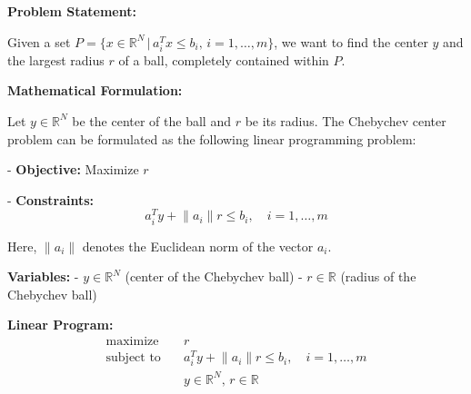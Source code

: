 \documentclass{article}
\begin{document}
\textbf{Problem Statement:}

Given a set \( P = \{ x \in \mathbb{R}^N \,|\, a_i^T x \leq b_i, \, i = 1, \ldots, m \} \), we want to find the center \( y \) and the largest radius \( r \) of a ball, completely contained within \( P \).

\textbf{Mathematical Formulation:}

Let \( y \in \mathbb{R}^N \) be the center of the ball and \( r \) be its radius. The Chebychev center problem can be formulated as the following linear programming problem:

- \textbf{Objective:} Maximize \( r \)

- \textbf{Constraints:}
  \[
  a_i^T y + \lVert a_i \rVert r \leq b_i, \quad i = 1, \ldots, m
  \]

Here, \( \lVert a_i \rVert \) denotes the Euclidean norm of the vector \( a_i \).

\textbf{Variables:} 
- \( y \in \mathbb{R}^N \) (center of the Chebychev ball)
- \( r \in \mathbb{R} \) (radius of the Chebychev ball)

\textbf{Linear Program:}
\begin{align*}
\text{maximize} \quad & r \\
\text{subject to} \quad & a_i^T y + \lVert a_i \rVert r \leq b_i, \quad i = 1, \ldots, m \\
                        & y \in \mathbb{R}^N, \, r \in \mathbb{R}
\end{align*}
\end{document}
